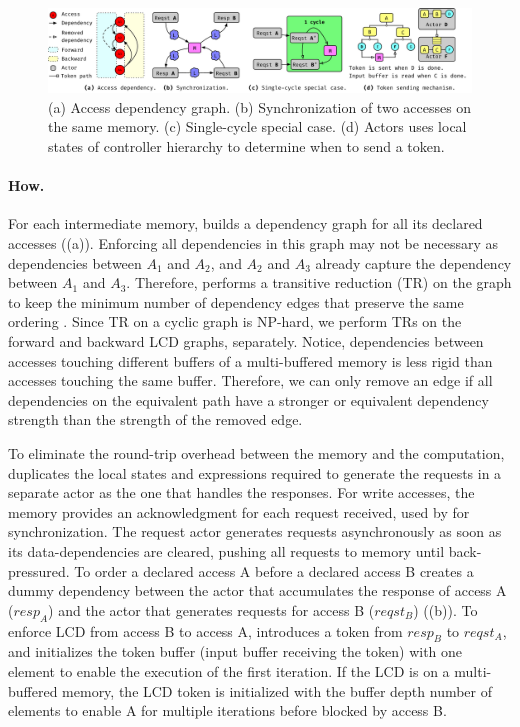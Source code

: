 \begin{figure}
\centering
\includegraphics[width=1.0\textwidth]{figs/synch_mech.pdf}
\caption{
    (a) Access dependency graph.
    (b) Synchronization of two accesses on the same memory.
    (c) Single-cycle special case.
    (d) Actors uses local states of controller hierarchy to determine when to send a token.
}\label{fig:depgraph}\label{fig:token}\label{fig:tokentrick}\label{fig:tokenwhen}
\end{figure}

\paragraph{How.} For each intermediate memory, \name{} builds a dependency graph for all its declared accesses ((a)).
Enforcing all dependencies in this graph may not be necessary as dependencies between $A_1$ and $A_2$, and $A_2$ and $A_3$ already capture the dependency between $A_1$ and $A_3$.
Therefore, \name{} performs a transitive reduction (TR) on the graph to keep the minimum number of dependency edges that preserve the same ordering \cite{tr}.
Since TR on a cyclic graph is NP-hard, we perform TRs on the forward and backward LCD graphs, separately.
Notice, dependencies between accesses touching different buffers of a multi-buffered memory is less rigid than accesses touching the same buffer.
Therefore, we can only remove an edge if all dependencies on the equivalent path have a stronger or equivalent dependency strength than the strength of the removed edge.

To eliminate the round-trip overhead between the memory and the computation, 
\name{} duplicates the local states and expressions required to generate the requests in a separate actor as the one that handles the responses.
For write accesses, the memory provides an acknowledgment for each request received, used by \name for synchronization.
The request actor generates requests asynchronously as soon as its data-dependencies are cleared, pushing all requests to memory until back-pressured.
To order a declared access A before a declared access B
\name creates a dummy dependency between the actor that accumulates the response of access A ($resp_A$) and the actor that generates requests for access B ($reqst_B$) ((b)).
To enforce LCD from access B to access A, \name introduces a token from $resp_B$ to $reqst_A$, and initializes the token buffer (input buffer receiving the token) with one element to enable the execution of the first iteration.
If the LCD is on a multi-buffered memory, the LCD token is initialized with the buffer depth number of elements to enable A for multiple iterations before blocked by access B.


